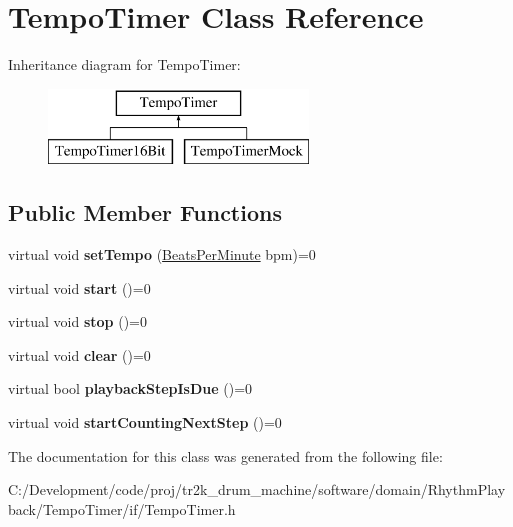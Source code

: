 \hypertarget{class_tempo_timer}{}\section{Tempo\+Timer Class Reference}
\label{class_tempo_timer}
Inheritance diagram for Tempo\+Timer\+:\begin{figure}[H]
\begin{center}
\leavevmode
\includegraphics[height=2.000000cm]{class_tempo_timer}
\end{center}
\end{figure}
\subsection*{Public Member Functions}
\begin{DoxyCompactItemize}
\item 
\mbox{\label{class_tempo_timer_a7becbb115ca987ae7629f6cb40f6824c}} 
virtual void {\bfseries set\+Tempo} (\mbox{\hyperlink{class_beats_per_minute}{Beats\+Per\+Minute}} bpm)=0
\item 
\mbox{\label{class_tempo_timer_aa33c53fa2a53e985d833c48a54a6b31c}} 
virtual void {\bfseries start} ()=0
\item 
\mbox{\label{class_tempo_timer_addd234d765f7b39bd26da5bc09bf9e0a}} 
virtual void {\bfseries stop} ()=0
\item 
\mbox{\label{class_tempo_timer_a2ae88d3a0e961dd42577b8b93e1ab6df}} 
virtual void {\bfseries clear} ()=0
\item 
\mbox{\label{class_tempo_timer_ac0241c95a4c094bf62aede38cf9de595}} 
virtual bool {\bfseries playback\+Step\+Is\+Due} ()=0
\item 
\mbox{\label{class_tempo_timer_a3758ecc82d1ceaec84076d1852275da3}} 
virtual void {\bfseries start\+Counting\+Next\+Step} ()=0
\end{DoxyCompactItemize}


The documentation for this class was generated from the following file\+:\begin{DoxyCompactItemize}
\item 
C\+:/\+Development/code/proj/tr2k\+\_\+drum\+\_\+machine/software/domain/\+Rhythm\+Playback/\+Tempo\+Timer/if/Tempo\+Timer.\+h\end{DoxyCompactItemize}
